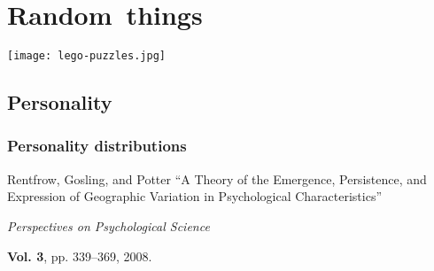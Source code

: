 

  

\section{Random\ things}

\begin{frame}
  \begin{center}
    \texttt{[image: lego-puzzles.jpg]}
  \end{center}
\end{frame}

\subsection{Personality}

\begin{frame}
  \frametitle{Personality distributions}

  \begin{block}{Rentfrow, Gosling, and Potter\cite{rentfrow2008a}}
    ``A Theory of the Emergence, Persistence, and Expression of Geographic Variation in  Psychological Characteristics''

    \smallskip

    \textit{Perspectives on Psychological Science}

    \smallskip

    \textbf{Vol. 3}, pp. 339--369, 2008.
  \end{block}

\end{frame}


